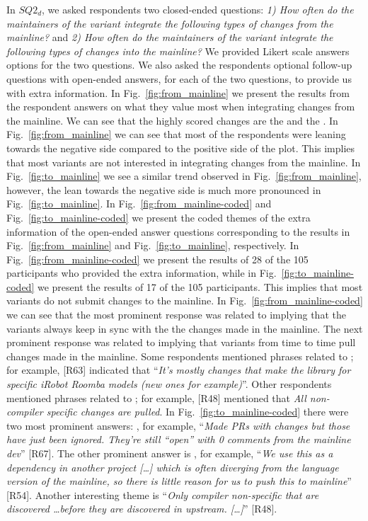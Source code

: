 \nd In $SQ2_{d}$, we asked respondents two closed-ended questions: \textit{1) How often do the maintainers of the variant integrate the following types of changes from the mainline?} and\textit{ 2) How often do the maintainers of the variant integrate the following types of changes into the mainline?}
We provided Likert scale answers options for the two questions. We also asked the respondents optional follow-up questions with open-ended answers, for each of the two questions, to provide us with extra information.
In Fig.~\ref{fig:from_mainline} we present the results from the respondent answers on what they value most when integrating changes from the mainline. We can see that the highly scored changes are the  and the . In Fig.~\ref{fig:from_mainline} we can see that most of the respondents were leaning towards the negative side compared to the positive side of the plot.
This implies that most variants are not interested in integrating changes from the mainline.
In Fig.~\ref{fig:to_mainline} we see a similar trend observed in Fig.~\ref{fig:from_mainline}, however, the lean towards the negative side is much more pronounced in Fig.~\ref{fig:to_mainline}.
In Fig.~\ref{fig:from_mainline-coded} and Fig.~\ref{fig:to_mainline-coded} we present the coded themes of the extra information of the open-ended answer questions corresponding to the results in Fig.~\ref{fig:from_mainline} and Fig.~\ref{fig:to_mainline}, respectively. In Fig.~\ref{fig:from_mainline-coded} we present the results of 28 of the 105 participants who provided the extra information, while in Fig.~\ref{fig:to_mainline-coded} we present the results of 17 of the 105 participants.
This implies that most variants do not submit changes to the mainline.
In Fig.~\ref{fig:from_mainline-coded} we can see that the most prominent response was related to  implying that the variants always keep in sync with the the changes made in the mainline. The next prominent response was related to  implying that variants from time to time pull changes made in the mainline. Some respondents mentioned phrases related to ; for example, [R63] indicated that ``\emph{It's mostly changes that make the library for specific iRobot Roomba models (new ones for example)}''. Other respondents mentioned phrases related to ; for example, [R48] mentioned that \emph{All non-compiler specific changes are pulled}.
In Fig.~\ref{fig:to_mainline-coded} there were two most prominent answers: , for example, ``\textit{Made PRs with changes but those have just been ignored. They're still ``open'' with 0 comments from the mainline dev}'' [R67]. The other prominent answer is , for example, ``\emph{We use this as a dependency in another project [\ldots] which is often diverging from the language version of the mainline, so there is little reason for us to push this to mainline}'' [R54]. Another interesting theme is ``\emph{Only compiler non-specific that are discovered \ldots before they are discovered in upstream. [\ldots]}'' [R48].

